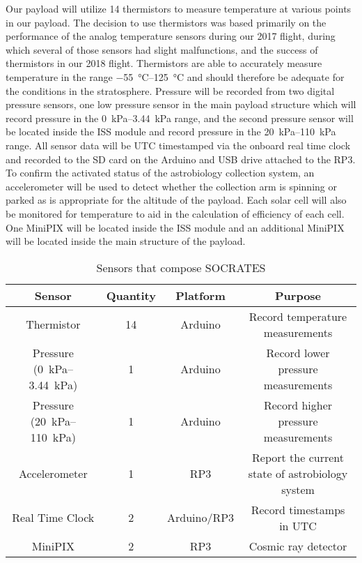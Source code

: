 Our payload will utilize 14 thermistors to measure temperature at various points in our payload. The decision to use thermistors was based primarily on the performance of the analog temperature sensors during our 2017 flight, during which several of those sensors had slight malfunctions, and the success of thermistors in our 2018 flight. Thermistors are able to accurately measure temperature in the range \SIrange{-55}{125}{\celsius} and should therefore be adequate for the conditions in the stratosphere. Pressure will be recorded from two digital pressure sensors, one low pressure sensor in the main payload structure which will record pressure in the \SIrange{0}{3.44}{\kilo\pascal} range, and the second pressure sensor will be located inside the ISS module and record pressure in the \SIrange{20}{110}{\kilo\pascal} range. All sensor data will be UTC timestamped via the onboard real time clock and recorded to the SD card on the Arduino and USB drive attached to the RP3. To confirm the activated status of the astrobiology collection system, an accelerometer will be used to detect whether the collection arm is spinning or parked as is appropriate for the altitude of the payload. Each solar cell will also be monitored for temperature to aid in the calculation of efficiency of each cell. One MiniPIX will be located inside the ISS module and an additional MiniPIX will be located inside the main structure of the payload.

\begin{table}[h!]
\centering
\caption{Sensors that compose SOCRATES}
\label{tab:Sensors}
\bigskip
\begin{tabular}{cccc}
  \hline
  \hline
  \multicolumn{1}{c}{\bfseries Sensor} & {\bfseries Quantity} & {\bfseries Platform} & {\bfseries Purpose} \\
  \hline
  Thermistor          		& 14 & Arduino  		& Record temperature measurements  \\
  Pressure (\SIrange{0}{3.44}{\kilo\pascal})        				& 1 & Arduino 		& Record lower pressure measurements \\
  Pressure (\SIrange{20}{110}{\kilo\pascal})        				& 1 & Arduino 		& Record higher pressure measurements \\
  Accelerometer       		& 1 & RP3    		& Report the current state of astrobiology system \\
  Real Time Clock 				& 2 & Arduino/RP3 	& Record timestamps in UTC \\
  MiniPIX         				& 2 & RP3     		& Cosmic ray detector \\
  \hline
  \hline
\end{tabular}
\end{table}


